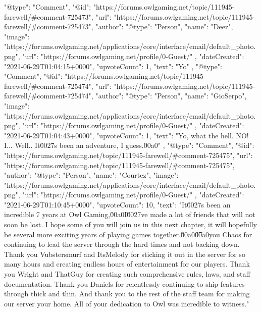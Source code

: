 {{            "@type": "Comment",
            "@id": "https://forums.owlgaming.net/topic/111945-farewell/#comment-725473",
            "url": "https://forums.owlgaming.net/topic/111945-farewell/#comment-725473",
            "author": {
                "@type": "Person",
                "name": "Deez",
                "image": "https://forums.owlgaming.net/applications/core/interface/email/default_photo.png",
                "url": "https://forums.owlgaming.net/profile/0-Guest/"
            },
            "dateCreated": "2021-06-29T01:04:15+0000",
            "upvoteCount": 1,
            "text": "Yo\n \n"
        },
        {
            "@type": "Comment",
            "@id": "https://forums.owlgaming.net/topic/111945-farewell/#comment-725474",
            "url": "https://forums.owlgaming.net/topic/111945-farewell/#comment-725474",
            "author": {
                "@type": "Person",
                "name": "GioSerpo",
                "image": "https://forums.owlgaming.net/applications/core/interface/email/default_photo.png",
                "url": "https://forums.owlgaming.net/profile/0-Guest/"
            },
            "dateCreated": "2021-06-29T01:04:43+0000",
            "upvoteCount": 1,
            "text": "Yo, what the hell. NO! I... Well.. It\u0027s been an adventure, I guess.\u00a0\n \n"
        },
        {
            "@type": "Comment",
            "@id": "https://forums.owlgaming.net/topic/111945-farewell/#comment-725475",
            "url": "https://forums.owlgaming.net/topic/111945-farewell/#comment-725475",
            "author": {
                "@type": "Person",
                "name": "Courtez",
                "image": "https://forums.owlgaming.net/applications/core/interface/email/default_photo.png",
                "url": "https://forums.owlgaming.net/profile/0-Guest/"
            },
            "dateCreated": "2021-06-29T01:10:45+0000",
            "upvoteCount": 10,
            "text": "It\u0027s been an incredible 7 years at Owl Gaming,\u00a0I\u0027ve made a lot of friends that will not soon be lost. I hope some of you will join us in this next chapter, it will hopefully be several more exciting years of playing games together.\u00a0\n \n\n\n\t\u00a0\n \n\n\n\tThank you Chaos for continuing to lead the server through the hard times and not backing down. Thank you Vubstersmurf and ItsMelody for sticking it out in the server for so many hours and creating endless hours of entertainment for our players. Thank you Wright and ThatGuy for creating such comprehensive rules, laws, and staff documentation. Thank you Daniels for relentlessly continuing to ship features through thick and thin. And thank you to the rest of the staff team for making our server your home. All of your dedication to Owl was incredible to witness.\n \n"
}}
